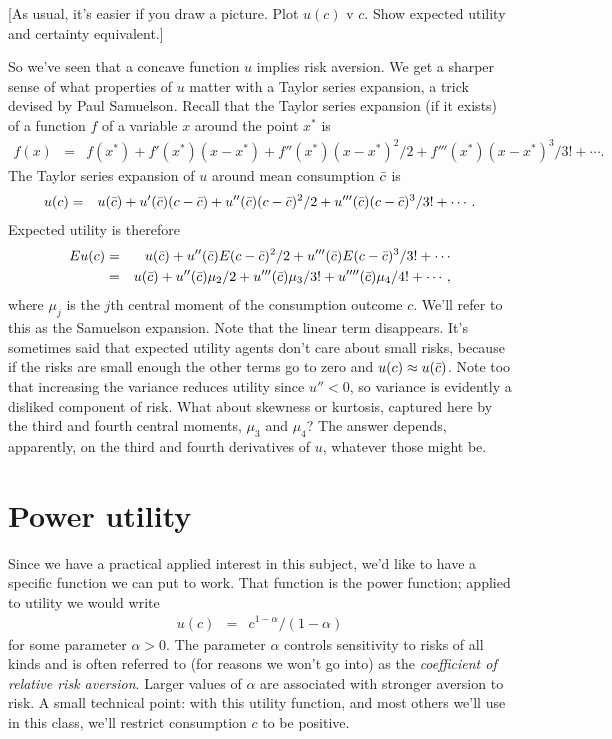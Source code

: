 [As usual, it's easier if you draw a picture.
Plot $u(c)$ v $c$.
Show expected utility and certainty equivalent.]

So we've seen that a concave function $u$ implies risk aversion.
We get a sharper sense of what properties of $u$ matter with
a Taylor series expansion,
a trick devised by Paul Samuelson.
Recall that the Taylor series expansion (if it exists) of a
function $f$ of a variable $x$ around the point $x^*$ is
\begin{eqnarray*}
    f(x) &=& f(x^*) + f'(x^*) (x-x^*) + f''(x^*) (x-x^*)^2/2 +
        f'''(x^*) (x-x^*)^3/3! + \cdots .
\end{eqnarray*}
The Taylor series expansion of $u$ around mean consumption $\bar{c}$
is
\begin{eqnarray*}
    u(c) &=& u(\bar{c}) + u'(\bar{c}) (c-\bar{c})  + u''(\bar{c}) (c-\bar{c})^2/2
        + u'''(\bar{c}) (c-\bar{c})^3/3! + \cdots .
\end{eqnarray*}
Expected utility is therefore
\begin{eqnarray}
  E u(c) &=& u(\bar{c}) + u''(\bar{c}) E (c-\bar{c})^2/2
        + u'''(\bar{c}) E (c-\bar{c})^3/3! + \cdots \nonumber \\
        &=& u(\bar{c}) + u''(\bar{c}) \mu_2/2
            + u'''(\bar{c}) \mu_3 /3! + u''''(\bar{c}) \mu_4 /4! + \cdots ,
        \label{eq:eu-samuelson}
\end{eqnarray}
where $\mu_j$ is the $j$th central moment of the consumption outcome $c$.
We'll refer to this as the Samuelson expansion.
Note that the linear term disappears.
It's sometimes said that expected utility agents
don't care about small risks, because if the risks are small enough
the other terms go to zero and $u(c) \approx u(\bar{c})$.
Note too that increasing the variance reduces
utility since $u'' < 0$,
so variance is evidently a disliked component of risk.
What about skewness or kurtosis, captured here by the third
and fourth central moments, $\mu_3$ and $\mu_4$?
The answer depends, apparently,
on the third and fourth derivatives of $u$,
whatever those might be.


\section{Power utility}

Since we have a practical applied interest in this subject,
we'd like to have a specific function we can put to work.
That function is the power function;
applied to utility we would write
\begin{eqnarray*}
    u(c) &=& c^{1-\alpha}/(1-\alpha)
\end{eqnarray*}
for some parameter $\alpha > 0$.
The parameter $\alpha$ controls sensitivity to risks of all kinds
and is often referred to (for reasons we won't go into)
as the {\it coefficient of relative risk aversion\/}.
Larger values of $\alpha$ are associated with stronger aversion to risk.
A small technical point:  with this utility function,
and most others we'll use in this class,
we'll restrict consumption $c$ to be positive.

